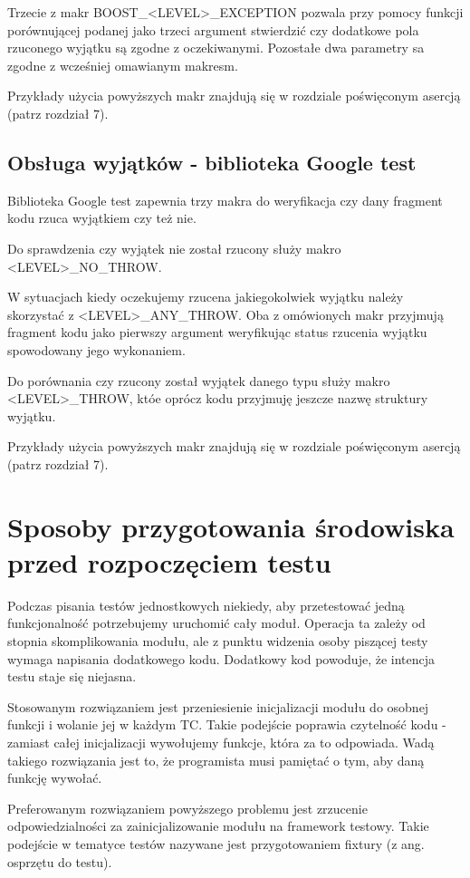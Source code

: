 \documentclass[12pt,a4paper,notitlepage]{report}
\begin{document}
Trzecie z makr BOOST{\_}<LEVEL>{\_}EXCEPTION pozwala przy pomocy funkcji porównującej podanej jako trzeci argument stwierdzić czy dodatkowe pola rzuconego wyjątku są zgodne z oczekiwanymi. Pozostałe dwa parametry sa zgodne z wcześniej omawianym makresm.

Przykłady użycia powyższych makr znajdują się w rozdziale poświęconym asercją (patrz rozdział 7).

\section{Obsługa wyjątków - biblioteka Google test}
Biblioteka Google test zapewnia trzy makra do weryfikacja czy dany fragment kodu rzuca wyjątkiem czy też nie.

Do sprawdzenia czy wyjątek nie został rzucony służy makro <LEVEL>{\_}NO{\_}THROW.

W sytuacjach kiedy oczekujemy rzucena jakiegokolwiek wyjątku należy skorzystać z <LEVEL>{\_}ANY{\_}THROW. Oba z omówionych makr przyjmują fragment kodu jako pierwszy argument weryfikując status rzucenia wyjątku spowodowany jego wykonaniem.

Do porównania czy rzucony został wyjątek danego typu służy makro <LEVEL>{\_}THROW, któe oprócz kodu przyjmuję jeszcze nazwę struktury wyjątku.

Przykłady użycia powyższych makr znajdują się w rozdziale poświęconym asercją (patrz rozdział 7). 

\chapter{Sposoby przygotowania środowiska przed rozpoczęciem testu}

Podczas pisania testów jednostkowych niekiedy, aby przetestować jedną funkcjonalność potrzebujemy uruchomić cały moduł. Operacja ta zależy od stopnia skomplikowania modułu, ale z punktu widzenia osoby piszącej testy wymaga napisania dodatkowego kodu. Dodatkowy kod powoduje, że intencja testu staje się niejasna. 

Stosowanym rozwiązaniem jest przeniesienie inicjalizacji modułu do osobnej funkcji i wolanie jej w każdym TC. Takie podejście poprawia czytelność kodu - zamiast całej inicjalizacji wywołujemy funkcje, która za to odpowiada. Wadą takiego rozwiązania jest to, że programista musi pamiętać o tym, aby daną funkcję wywołać.

Preferowanym rozwiązaniem powyższego problemu jest zrzucenie odpowiedzialności za zainicjalizowanie modułu na framework testowy. Takie podejście w tematyce testów nazywane jest przygotowaniem fixtury (z ang. osprzętu do testu).
\end{document}
